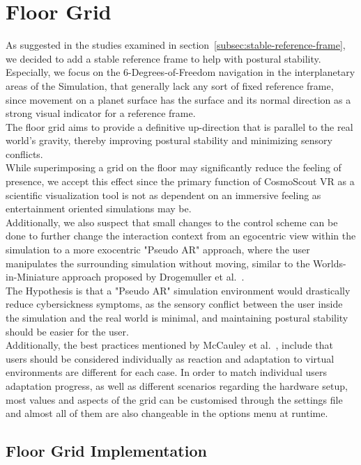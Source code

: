 \section{Floor Grid}\label{sec:floor-grid}

As suggested in the studies examined in section~\ref{subsec:stable-reference-frame}, we decided to add a stable
reference frame to help with postural stability.
Especially, we focus on the 6-Degrees-of-Freedom navigation in the interplanetary areas of the Simulation, that
generally lack any sort of fixed reference frame, since movement on a planet surface has the surface and its normal
direction as a strong visual indicator for a reference frame.
\\
The floor grid aims to provide a definitive up-direction that is parallel to the real world's gravity, thereby
improving postural stability and minimizing sensory conflicts.
\\
While superimposing a grid on the floor may significantly reduce the feeling of presence, we accept this effect since
the primary function of CosmoScout VR as a scientific visualization tool is not as dependent on an immersive feeling
as entertainment oriented simulations may be.
\\
Additionally, we also suspect that small changes to the control scheme can be done to further change the interaction
context from an egocentric view within the simulation to a more exocentric "Pseudo AR" approach, where the user
manipulates the surrounding simulation without moving, similar to the Worlds-in-Miniature approach proposed
by Drogemuller et al.~\cite{Drogemuller2020}.
\\
The Hypothesis is that a "Pseudo AR" simulation environment would drastically reduce cybersickness symptoms, as the
sensory conflict between the user inside the simulation and the real world is minimal, and maintaining postural
stability should be easier for the user.
\\
Additionally, the best practices mentioned by McCauley et al.~\cite{McCauley1992}, include that users should be
considered individually as reaction and adaptation to virtual environments are different for each case.
In order to match individual users adaptation progress, as well as different scenarios regarding the hardware setup,
most values and aspects of the grid can be customised through the settings file and almost all of them are also
changeable in the options menu at runtime.

\subsection{Floor Grid Implementation}\label{subsec:floor-grid-implementation}

